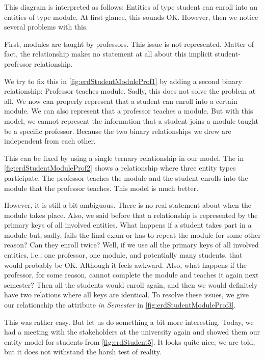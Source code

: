 This diagram is interpreted as follows:
Entities of type student can enroll into an entities of type module.
At first glance, this sounds OK.
However, then we notice several problems with this.

First, modules are taught by professors.
This issue is not represented.
Matter of fact, the relationship makes no statement at all about this implicit student-professor relationship.

We try to fix this in \cref{fig:erdStudentModuleProf1} by adding a second binary relationship:
Professor teaches module.
Sadly, this does not solve the problem at all.
We now can properly represent that a student can enroll into a certain module.
We can also represent that a professor teaches a module.
But with this model, we cannot represent the information that a student joins a module taught be a specific professor.
Because the two binary relationships we drew are independent from each other.

This can be fixed by using a single ternary relationship in our model.
The  in \cref{fig:erdStudentModuleProf2} shows a relationship where three entity types participate.
The professor teaches the module and the student enrolls into the module that the professor teaches.
This model is much better.

However, it is still a bit ambiguous.
There is no real statement about when the module takes place.
Also, we said before that a relationship is represented by the primary keys of all involved entities.
What happens if a student takes part in a module but, sadly, fails the final exam or has to repeat the module for some other reason?
Can they enroll twice?
Well, if we use all the primary keys of all involved entities, i.e., one professor, one module, and potentially many students, that would probably be OK.
Although it feels awkward.
Also, what happens if the professor, for some reason, cannot complete the module and teaches it again next semester?
Then all the students would enroll again, and then we would definitely have two relations where all keys are identical.
To resolve these issues, we give our relationship the attribute \emph{in Semester} in \cref{fig:erdStudentModuleProf3}.

This was rather easy.
But let us do something a bit more interesting.
Today, we had a meeting with the stakeholders at the university again and showed them our entity model for students from \cref{fig:erdStudent5}.
It looks quite nice, we are told, but it does not withstand the harsh test of reality.

